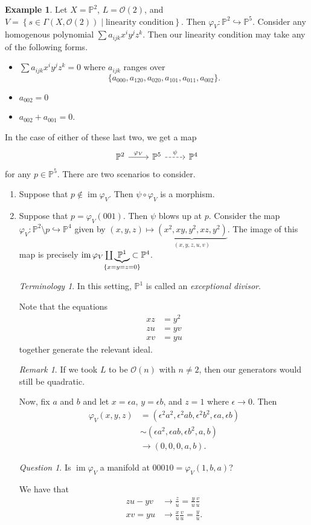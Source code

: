 \documentclass[10pt,letterpaper,cm]{nupset}
\theoremstyle{definition}
\newtheorem{exmp}[defn]{Example}
\theoremstyle{theorem}
\theoremstyle{remark}
\newtheorem{remark}[defn]{Remark}
\newtheorem*{question}{Question}
\newtheorem*{term}{Terminology}
\renewcommand{\O}{\mathcal O}
\renewcommand{\P}{\mathbb P}
\newcommand{\1}{\mathbb{1}}
\newcommand{\0}{\vec 0}
\DeclareMathOperator{\im}{im}
\newcommand{\bi}{\begin{itemize}}
\newcommand{\ei}{\end{itemize}}
\newcommand{\be}{\begin{enumerate}}
\newcommand{\ee}{\end{enumerate}}
\begin{document}
\begin{exmp}
Let $X = \P^2$, $L = \O(2)$, and $V = \left\{s\in \Gamma\left(X, \O(2)\right) \mid \text{linearity condition}\right\}$. Then $\varphi_V : \P^2 \hookrightarrow \P^5$. Consider any homogenous polynomial $\sum a_{ijk}x^iy^jz^k$. Then our linearity condition may take any of the following forms. 
\bi
\item $\sum a_{ijk}x^iy^jz^k =0$ where $a_{ijk}$ ranges over
\[
\{a_{000}, a_{120}, a_{020}, a_{101}, a_{011}, a_{002}\}.
\] 
\item $a_{002}=0$ 
\item $a_{002} +a_{001} =0$.
\ei
In the case of either of these last two, we get a map 
\[ \begin{tikzcd}
\P^2 \arrow[r, "\varphi_V"] & \P^5 \arrow[r, "\psi", dashed] & \P^4
\end{tikzcd}
\] for any $p\in \P^5$. There are two scenarios to consider.
\be[label = (\alph*)]
\item Suppose that $p \notin \im{\varphi_V}$. Then $\psi \circ \varphi_V$ is a morphism.
\item Suppose that $p = \varphi_V\left(001\right)$. Then $\psi$ blows up at $p$. Consider the map $\varphi_V : \P^2\setminus p \hookrightarrow \P^4$ given by $\left(x,y,z\right) \mapsto \underbrace{\left(x^2, xy, y^2, xz, y^2\right)}_{\left(x,y,z,u,v\right)}$. The image of this map is precisely $\im{\varphi_V} \coprod \underbrace{\P^1}_{\mathclap{\{x=y=z=0\}}} \subset \P^4$.
\begin{term}
In this setting, $\P^1$ is called an \textit{exceptional divisor}.
\end{term}
Note that the equations
\begin{align*}
xz & = y^2
\\ zu & = yv
\\ xv & = yu
\end{align*} together generate the relevant ideal.
\begin{remark}
If we took $L$ to be $\O(n)$ with $n\ne 2$, then our generators would still be quadratic.
\end{remark}
Now, fix $a$ and $b$ and let $x=\epsilon{a}$, $y=\epsilon{b}$, and $z=1$ where $\epsilon \to 0$. Then 
\begin{align*}
\varphi_V(x,y,z) & = \left(\epsilon^2a^2, \epsilon^2ab, \epsilon^2 b^2, \epsilon{a}, \epsilon{b}\right) 
\\ & \sim \left(\epsilon a^2, \epsilon{ab}, \epsilon{b^2}, a, b\right) 
\\ & \to \left(0,0,0,a,b\right).
\end{align*}
\begin{question}
Is $\im{\varphi_V}$ a manifold at $00010 = \varphi_V(1,b,a)$?
\end{question}
We have that
\begin{align*}
zu - yv & \to \frac{z}{u} = \frac{y}{u}\frac{v}{u}
\\ xv = yu & \to \frac{x}{u}\frac{v}{u} = \frac{y}{u}.
\end{align*}
\ee
\end{exmp}
\end{document}
